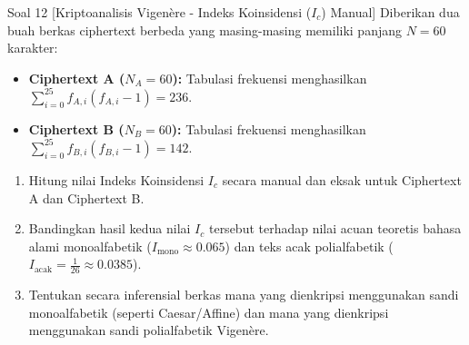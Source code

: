 \documentclass[11pt,a4paper]{article}
\begin{document}
\begin{soalanalisis}{Soal 12 [Kriptoanalisis Vigenère - Indeks Koinsidensi ($I_c$) Manual]}
Diberikan dua buah berkas ciphertext berbeda yang masing-masing memiliki panjang $N = 60$ karakter:
\begin{itemize}
    \item \textbf{Ciphertext A ($N_A = 60$):} Tabulasi frekuensi menghasilkan $\sum_{i=0}^{25} f_{A, i}(f_{A, i} - 1) = 236$.
    \item \textbf{Ciphertext B ($N_B = 60$):} Tabulasi frekuensi menghasilkan $\sum_{i=0}^{25} f_{B, i}(f_{B, i} - 1) = 142$.
\end{itemize}
\begin{enumerate}[label=(\alph*)]
    \item Hitung nilai Indeks Koinsidensi $I_c$ secara manual dan eksak untuk Ciphertext A dan Ciphertext B.
    \item Bandingkan hasil kedua nilai $I_c$ tersebut terhadap nilai acuan teoretis bahasa alami monoalfabetik ($I_{\text{mono}} \approx 0.065$) dan teks acak polialfabetik ($I_{\text{acak}} = \frac{1}{26} \approx 0.0385$).
    \item Tentukan secara inferensial berkas mana yang dienkripsi menggunakan sandi monoalfabetik (seperti Caesar/Affine) dan mana yang dienkripsi menggunakan sandi polialfabetik Vigenère.
\end{enumerate}
\end{soalanalisis}
\end{document}
